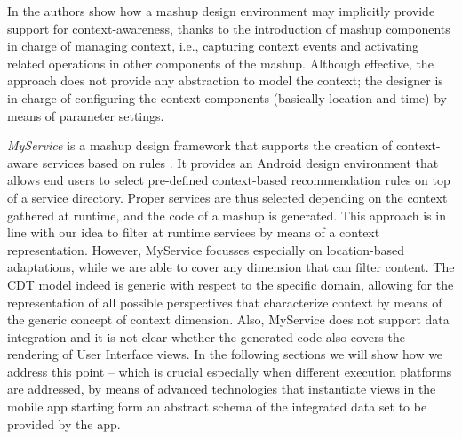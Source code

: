 In \cite{DBLP:conf/wise/DanielM08} the authors show how a mashup design environment may implicitly provide support for context-awareness, thanks to the introduction of mashup components in charge of managing context, i.e., capturing context events and activating related operations in other components of the mashup. Although effective, the approach does not provide any abstraction to model the context; the designer is in charge of configuring the context components (basically location and time) by means of parameter settings. 

\emph{MyService }is a mashup design framework that supports the creation of context-aware services based on rules \cite{LeeJoo2013}. It provides an Android design environment that allows end users to select pre-defined context-based recommendation rules on top of a service directory. Proper services are thus selected depending on the context gathered at runtime, and the code of a mashup is generated. This approach is in line with our idea to filter at runtime services by means of a context representation. However, MyService focusses especially on location-based adaptations, while we are able to cover any dimension that can filter content. The CDT model indeed is generic with respect to the specific domain, allowing for the representation of  all possible perspectives that characterize context  by means of the generic concept of context dimension. Also, MyService does not support data integration and it is not clear whether the generated code also covers the rendering of User Interface views. In the following sections we will show how we address this point -- which is crucial especially when different execution platforms are addressed, by means of advanced technologies that instantiate views in the mobile app starting form an abstract schema of the integrated data set to be provided by the app.

